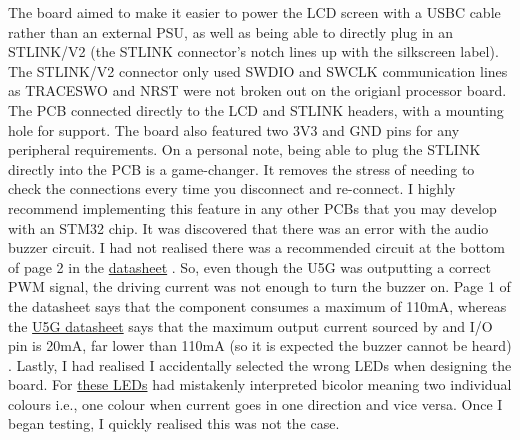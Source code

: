 The board aimed to make it easier to power the LCD screen with a USBC cable rather than an external PSU, as well as being able to directly plug in an STLINK/V2 (the STLINK connector's notch lines up with the silkscreen label). The STLINK/V2 connector only used SWDIO and SWCLK communication lines as TRACESWO and NRST were not broken out on the origianl processor board. The PCB connected directly to the LCD and STLINK headers, with a mounting hole for support. The board also featured two 3V3 and GND pins for any peripheral requirements. On a personal note, being able to plug the STLINK directly into the PCB is a game-changer. It removes the stress of needing to check the connections every time you disconnect and re-connect. I highly recommend implementing this feature in any other PCBs that you may develop with an STM32 chip.
\nl
It was discovered that there was an error with the audio buzzer circuit. I had not realised there was a recommended circuit at the bottom of page 2 in the \href{https://au.mouser.com/datasheet/3/6118/1/cbt_09427_smt_tr.pdf}{datasheet} \cite{samesky-buzzer}. So, even though the U5G was outputting a correct PWM signal, the driving current was not enough to turn the buzzer on. Page 1 of the datasheet says that the component consumes a maximum of 110mA, whereas the \href{https://www.st.com/resource/en/datasheet/stm32u5g7vj.pdf#page=157}{U5G datasheet} says that the maximum output current sourced by and I/O pin is 20mA, far lower than 110mA (so it is expected the buzzer cannot be heard) \cite{u5-datasheet} \cite{samesky-buzzer}.
\nl
Lastly, I had realised I accidentally selected the wrong LEDs when designing the board. For \href{mouser.com/ProductDetail/Vishay/VLMG1300-GS08?qs=uoVnq4yU%252B9JyXEbHJ6%2FhZQ%3D%3D}{these LEDs} had mistakenly interpreted bicolor meaning two individual colours i.e., one colour when current goes in one direction and vice versa. Once I began testing, I quickly realised this was not the case.